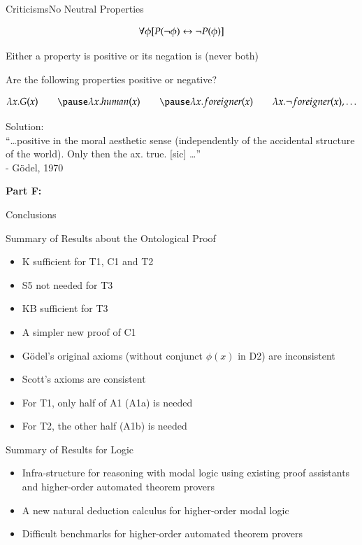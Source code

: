 \begin{frame}{Criticisms}{No Neutral Properties} \centering

$$\forall \phi [P(\neg \phi) \leftrightarrow \neg P(\phi)]$$

Either a property is positive or its negation is (never both)
		  
\pause
\bigskip

Are the following properties positive or negative?

$$
\lambda x. G(x) \qquad \pause \lambda x. human(x) \qquad \pause \lambda x. foreigner(x) \qquad \lambda x. \neg foreigner(x), \ldots
$$

\pause
\bigskip

Solution: \\
``\ldots positive in the moral aesthetic sense (independently of the accidental structure of the world). Only then the ax. true. [sic] \ldots''
\\ \hfill - G\"odel, 1970
\end{frame}



\begin{transitionframe}
\textbf{Part F:}

Conclusions
\end{transitionframe}



\begin{frame}{Summary of Results about the Ontological Proof}
\begin{itemize}[<+->]
\item K sufficient for T1, C1 and T2 
\item S5 not needed for T3
\item KB sufficient for T3 
\item A simpler new proof of C1
\item G\"odel's original axioms (without conjunct $\phi(x)$ in D2) are inconsistent
\item Scott's axioms are consistent
\item For T1, only half of A1 (A1a) is needed 
\item For T2, the other half (A1b) is needed
\end{itemize}
\end{frame}


\begin{frame}{Summary of Results for Logic} \small
\begin{itemize}[<+->]
\item Infra-structure for reasoning with modal logic using existing proof assistants and higher-order automated theorem provers
\item A new natural deduction calculus for higher-order modal logic
\item Difficult benchmarks for higher-order automated theorem provers
\end{itemize}
\end{frame}

